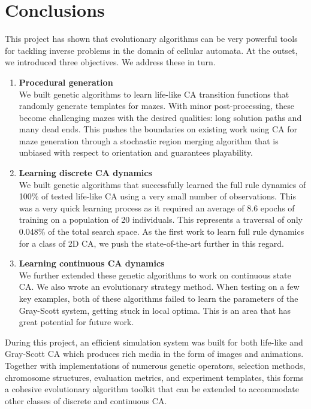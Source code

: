\chapter{Conclusions}

This project has shown that evolutionary algorithms can be very powerful tools for tackling inverse problems in the domain of cellular automata. At the outset, we introduced three objectives. We address these in turn.
\begin{enumerate}
    \item \textbf{Procedural generation}\label{obj-1}\\
    We built genetic algorithms to learn life-like CA transition functions that randomly generate templates for mazes. With minor post-processing, these become challenging mazes with the desired qualities: long solution paths and many dead ends. This pushes the boundaries on existing work using CA for maze generation\cite{adams2017procedural, adams2018evolving} through a stochastic region merging algorithm that is unbiased with respect to orientation and guarantees playability.
    \item \textbf{Learning discrete CA dynamics}\label{obj-1}\\
    We built genetic algorithms that successfully learned the full rule dynamics of 100\% of tested life-like CA using a very small number of observations. This was a very quick learning process as it required an average of 8.6 epochs of training on a population of 20 individuals. This represents a traversal of only 0.048\% of the total search space. As the first work to learn full rule dynamics for a class of 2D CA, we push the state-of-the-art further in this regard.
    \item \textbf{Learning continuous CA dynamics}\\
    We further extended these genetic algorithms to work on continuous state CA. We also wrote an evolutionary strategy method. When testing on a few key examples, both of these algorithms failed to learn the parameters of the Gray-Scott system, getting stuck in local optima. This is an area that has great potential for future work.
\end{enumerate}

During this project, an efficient simulation system was built for both life-like and Gray-Scott CA which produces rich media in the form of images and animations. Together with implementations of numerous genetic operators, selection methods, chromosome structures, evaluation metrics, and experiment templates, this forms a cohesive evolutionary algorithm toolkit that can be extended to accommodate other classes of discrete and continuous CA.

